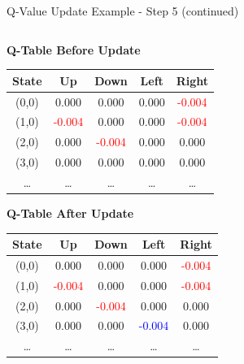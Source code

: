 \documentclass[aspectratio=169]{beamer}
\begin{document}
\begin{frame}{Q-Value Update Example - Step 5 (continued)}
    
    \begin{columns}
        \begin{column}{0.5\textwidth}
            \textbf{Q-Table Before Update}
            \small
            \begin{table}[h]
                \centering
                \begin{tabular}{|c|c|c|c|c|}
                    \hline
                    \textbf{State} & \textbf{Up} & \textbf{Down} & \textbf{Left} & \textbf{Right} \\
                    \hline
                    (0,0) & 0.000 & 0.000 & 0.000 & \textcolor{red}{-0.004} \\
                    (1,0) & \textcolor{red}{-0.004} & 0.000 & 0.000 & \textcolor{red}{-0.004} \\
                    (2,0) & 0.000 & \textcolor{red}{-0.004} & 0.000 & 0.000 \\
                    (3,0) & 0.000 & 0.000 & 0.000 & 0.000 \\
                    \dots & \dots & \dots & \dots & \dots \\
                    \hline
                \end{tabular}
            \end{table}
            
            \textbf{Q-Table After Update}
            \small
            \begin{table}[h]
                \centering
                \begin{tabular}{|c|c|c|c|c|}
                    \hline
                    \textbf{State} & \textbf{Up} & \textbf{Down} & \textbf{Left} & \textbf{Right} \\
                    \hline
                    (0,0) & 0.000 & 0.000 & 0.000 & \textcolor{red}{-0.004} \\
                    (1,0) & \textcolor{red}{-0.004} & 0.000 & 0.000 & \textcolor{red}{-0.004} \\
                    (2,0) & 0.000 & \textcolor{red}{-0.004} & 0.000 & 0.000 \\
                    (3,0) & 0.000 & 0.000 & \textcolor{blue}{-0.004} & 0.000 \\
                    \dots & \dots & \dots & \dots & \dots \\
                    \hline
                \end{tabular}
            \end{table}
        \end{column}
        

\end{columns}
\end{frame}
\end{document}
